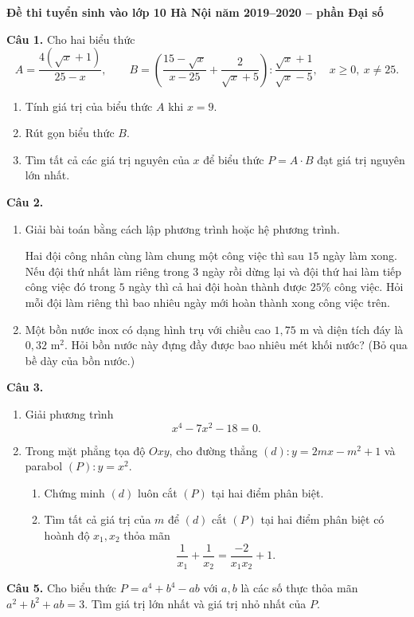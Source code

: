 \documentclass[12pt,a4paper]{article}
\begin{document}
\begin{center}
{\Large\bfseries Đề thi tuyển sinh vào lớp 10 Hà Nội năm 2019--2020 -- phần Đại số}
\end{center}

\textbf{Câu 1.} Cho hai biểu thức
\[
A=\frac{4(\sqrt{x}+1)}{25-x},\qquad
B=\left(\frac{15-\sqrt{x}}{x-25}+\frac{2}{\sqrt{x}+5}\right):\frac{\sqrt{x}+1}{\sqrt{x}-5},
\quad x\ge0,\ x\ne25.
\]
\begin{enumerate}[label=\alph*)]
  \item Tính giá trị của biểu thức $A$ khi $x=9$.
  \item Rút gọn biểu thức $B$.
  \item Tìm tất cả các giá trị nguyên của $x$ để biểu thức $P=A\cdot B$ đạt giá trị nguyên lớn nhất.
\end{enumerate}

\textbf{Câu 2.}
\begin{enumerate}[label=\alph*)]
  \item Giải bài toán bằng cách lập phương trình hoặc hệ phương trình.

  Hai đội công nhân cùng làm chung một công việc thì sau $15$ ngày làm xong. Nếu đội thứ nhất làm riêng trong $3$ ngày rồi dừng lại và đội thứ hai làm tiếp công việc đó trong $5$ ngày thì cả hai đội hoàn thành được $25\%$ công việc. Hỏi mỗi đội làm riêng thì bao nhiêu ngày mới hoàn thành xong công việc trên.
  \item Một bồn nước inox có dạng hình trụ với chiều cao $1{,}75$ m và diện tích đáy là $0{,}32$ m$^2$. Hỏi bồn nước này đựng đầy được bao nhiêu mét khối nước? (Bỏ qua bề dày của bồn nước.)
\end{enumerate}

\textbf{Câu 3.}
\begin{enumerate}[label=\arabic*)]
  \item Giải phương trình
  \[
  x^4-7x^2-18=0.
  \]
  \item Trong mặt phẳng tọa độ $Oxy$, cho đường thẳng $(d):y=2mx-m^2+1$ và parabol $(P):y=x^2$.
  \begin{enumerate}[label=\alph*)]
    \item Chứng minh $(d)$ luôn cắt $(P)$ tại hai điểm phân biệt.
    \item Tìm tất cả giá trị của $m$ để $(d)$ cắt $(P)$ tại hai điểm phân biệt có hoành độ $x_1,x_2$ thỏa mãn
    \[
    \frac{1}{x_1}+\frac{1}{x_2}=\frac{-2}{x_1x_2}+1.
    \]
  \end{enumerate}
\end{enumerate}

\textbf{Câu 5.} Cho biểu thức $P=a^4+b^4-ab$ với $a,b$ là các số thực thỏa mãn $a^2+b^2+ab=3$. Tìm giá trị lớn nhất và giá trị nhỏ nhất của $P$.
\end{document}
